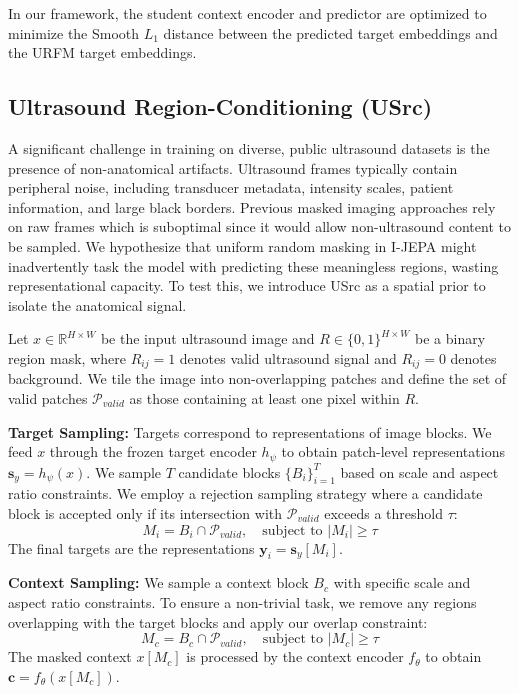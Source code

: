 \documentclass{article}
\theoremstyle{plain}
\theoremstyle{definition}
\theoremstyle{remark}
\begin{document}
In our framework, the student context encoder and predictor are optimized to minimize the Smooth $L_1$ distance between the predicted target embeddings and the URFM target embeddings.

\subsection{Ultrasound Region-Conditioning (USrc)}

A significant challenge in training on diverse, public ultrasound datasets is the presence of non-anatomical artifacts. Ultrasound frames typically contain peripheral noise, including transducer metadata, intensity scales, patient information, and large black borders. Previous masked imaging approaches rely on raw frames which is suboptimal since it would allow non-ultrasound content to be sampled. We hypothesize that uniform random masking in I-JEPA might inadvertently task the model with predicting these meaningless regions, wasting representational capacity. To test this, we introduce USrc as a spatial prior to isolate the anatomical signal.

Let $x \in \mathbb{R}^{H \times W}$ be the input ultrasound image and $R \in \{0, 1\}^{H \times W}$ be a binary region mask, where $R_{ij}=1$ denotes valid ultrasound signal and $R_{ij}=0$ denotes background. We tile the image into non-overlapping patches and define the set of valid patches $\mathcal{P}_{valid}$ as those containing at least one pixel within $R$.

\textbf{Target Sampling:} Targets correspond to representations of image blocks. We feed $x$ through the frozen target encoder $h_\psi$ to obtain patch-level representations $\mathbf{s}_y = h_\psi(x)$. We sample $T$ candidate blocks $\{B_i\}_{i=1}^T$ based on scale and aspect ratio constraints. We employ a rejection sampling strategy where a candidate block is accepted only if its intersection with $\mathcal{P}_{valid}$ exceeds a threshold $\tau$:
\begin{equation}
M_i = B_i \cap \mathcal{P}_{valid}, \quad \text{subject to } |M_i| \geq \tau
\end{equation}
The final targets are the representations $\mathbf{y}_i = \mathbf{s}_y[M_i]$.

\textbf{Context Sampling:} We sample a context block $B_c$ with specific scale and aspect ratio constraints. To ensure a non-trivial task, we remove any regions overlapping with the target blocks and apply our overlap constraint:
\begin{equation}
    M_c = B_c \cap \mathcal{P}_{valid}, \quad \text{subject to } |M_c| \geq \tau
\end{equation}
The masked context $x[M_c]$ is processed by the context encoder $f_\theta$ to obtain $\mathbf{c} = f_\theta(x[M_c])$.
\end{document}
